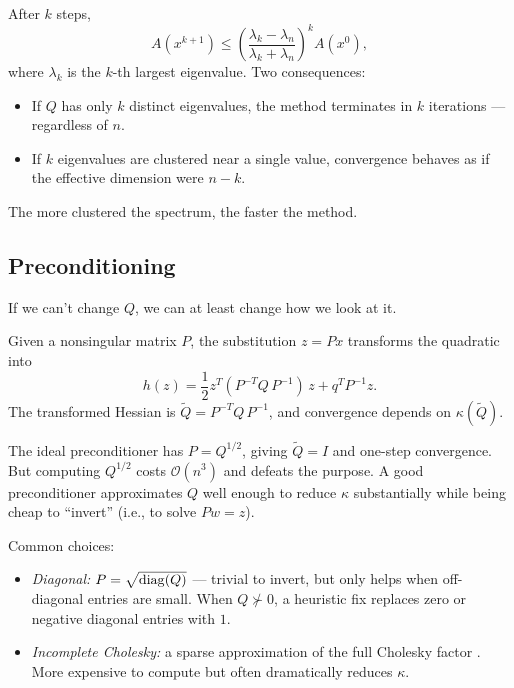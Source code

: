 \begin{thm}\label{thm:cg-eigen-conv}
	After $k$ steps,
	\begin{equation}\label{eq:cg-eigenvalue-bound}
		A(x^{k+1}) \leq \left(\frac{\lambda_k - \lambda_n}{\lambda_k + \lambda_n}\right)^{\!k} A(x^0),
	\end{equation}
	where $\lambda_k$ is the $k$-th largest eigenvalue.
	Two consequences:
	\begin{itemize}
		\item If $Q$ has only $k$ distinct eigenvalues, the method terminates in $k$ iterations --- regardless of $n$.
		\item If $k$ eigenvalues are clustered near a single value, convergence behaves as if the effective dimension were $n - k$.
	\end{itemize}
	The more clustered the spectrum, the faster the method.
\end{thm}


\subsection{Preconditioning}\label{ssec:preconditioning}

If we can't change $Q$, we can at least change how we look at it.

\begin{defn}\label{def:preconditioner}
	Given a nonsingular matrix $P$, the substitution $z = Px$ transforms the quadratic into
	\begin{equation}\label{eq:preconditioned-system}
		h(z) = \frac{1}{2} z^T (P^{-T} Q\, P^{-1})\, z + q^T P^{-1} z.
	\end{equation}
	The transformed Hessian is $\tilde{Q} = P^{-T} Q\, P^{-1}$, and convergence depends on $\kappa(\tilde{Q})$.
\end{defn}

The ideal preconditioner has $P = Q^{1/2}$, giving $\tilde{Q} = I$ and one-step convergence.
But computing $Q^{1/2}$ costs $\mathcal{O}(n^3)$ and defeats the purpose.
A good preconditioner approximates $Q$ well enough to reduce $\kappa$ substantially while being cheap to ``invert'' (i.e., to solve $Pw = z$).

Common choices:
\begin{itemize}
	\item \textit{Diagonal:} $P = \sqrt{\operatorname{diag}(Q)}$ --- trivial to invert, but only helps when off-diagonal entries are small.
		When $Q \not\succ 0$, a heuristic fix replaces zero or negative diagonal entries with $1$.
	\item \textit{Incomplete Cholesky:} a sparse approximation of the full Cholesky factor \cite{nocedal2006}.
		More expensive to compute but often dramatically reduces $\kappa$.
\end{itemize}

